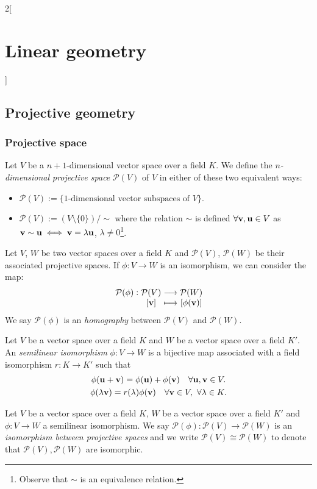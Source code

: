 \documentclass[../../../main.tex]{subfiles}
\begin{document}
\begin{multicols}{2}[\section{Linear geometry}]
  \subsection{Projective geometry}
  \subsubsection{Projective space}
  \begin{definition}
    Let $V$ be a $n+1$-dimensional vector space over a field $K$. We define the \emph{$n$-dimensional projective space} $\mathcal{P}(V)$ of $V$ in either of these two equivalent ways:
    \begin{itemize}
      \item $\displaystyle\mathcal{P}(V):=\{\text{1-dimensional vector subspaces of $V$}\}$.
      \item $\displaystyle\mathcal{P}(V):=(V\setminus\{0\})/\sim$ where the relation $\sim$ is defined $\forall\boldsymbol{\mathrm{v}},\boldsymbol{\mathrm{u}}\in V$ as $\boldsymbol{\mathrm{v}}\sim \boldsymbol{\mathrm{u}}\iff \boldsymbol{\mathrm{v}}=\lambda \boldsymbol{\mathrm{u}}$, $\lambda\ne 0$\footnote{Observe that $\sim$ is an equivalence relation.}.
    \end{itemize}
  \end{definition}
  \begin{definition}
    Let $V$, $W$ be two vector spaces over a field $K$ and $\mathcal{P}(V)$, $\mathcal{P}(W)$ be their associated projective spaces. If $\phi:V\rightarrow W$ is an isomorphism, we can consider the map:
    $$\function{\mathcal{P}(\phi)}{\mathcal{P}(V)}{\mathcal{P}(W)}{[\vf{v}] }{[\phi(\vf{v})]}$$
    We say $\mathcal{P}(\phi)$ is an \emph{homography} between $\mathcal{P}(V)$ and $\mathcal{P}(W)$.
  \end{definition}
  \begin{definition}
    Let $V$ be a vector space over a field $K$ and $W$ be a vector space over a field $K'$. An \emph{semilinear isomorphism} $\phi:V\rightarrow W$ is a bijective map associated with a field isomorphism $r:K\rightarrow K'$ such that
    \begin{gather*}
      \phi(\boldsymbol{\mathrm{u}}+\boldsymbol{\mathrm{v}})=\phi(\boldsymbol{\mathrm{u}})+\phi(\boldsymbol{\mathrm{v}})\quad \forall \boldsymbol{\mathrm{u}},\boldsymbol{\mathrm{v}}\in V.\\
      \phi(\lambda \boldsymbol{\mathrm{v}})=r(\lambda)\phi(\boldsymbol{\mathrm{v}})\quad \forall \boldsymbol{\mathrm{v}}\in V,\ \forall\lambda\in K.
    \end{gather*}
  \end{definition}
  \begin{definition}
    Let $V$ be a vector space over a field $K$, $W$ be a vector space over a field $K'$ and $\phi:V\rightarrow W$ a semilinear isomorphism. We say $\mathcal{P}(\phi):\mathcal{P}(V)\rightarrow\mathcal{P}(W)$ is an \emph{isomorphism between projective spaces} and we write $\mathcal{P}(V)\cong \mathcal{P}(W)$ to denote that $\mathcal{P}(V),\mathcal{P}(W)$ are isomorphic.

\end{definition}
\end{multicols}
\end{document}
